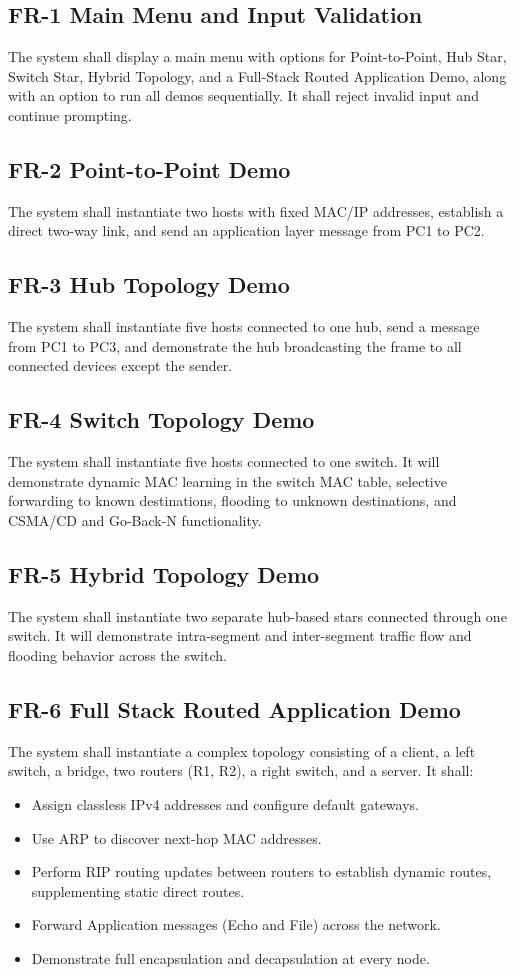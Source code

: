 \documentclass[12pt,a4paper]{article}
\begin{document}
\subsection{FR-1 Main Menu and Input Validation}
The system shall display a main menu with options for Point-to-Point, Hub Star, Switch Star, Hybrid Topology, and a Full-Stack Routed Application Demo, along with an option to run all demos sequentially. It shall reject invalid input and continue prompting.

\subsection{FR-2 Point-to-Point Demo}
The system shall instantiate two hosts with fixed MAC/IP addresses, establish a direct two-way link, and send an application layer message from PC1 to PC2.

\subsection{FR-3 Hub Topology Demo}
The system shall instantiate five hosts connected to one hub, send a message from PC1 to PC3, and demonstrate the hub broadcasting the frame to all connected devices except the sender.

\subsection{FR-4 Switch Topology Demo}
The system shall instantiate five hosts connected to one switch. It will demonstrate dynamic MAC learning in the switch MAC table, selective forwarding to known destinations, flooding to unknown destinations, and CSMA/CD and Go-Back-N functionality.

\subsection{FR-5 Hybrid Topology Demo}
The system shall instantiate two separate hub-based stars connected through one switch. It will demonstrate intra-segment and inter-segment traffic flow and flooding behavior across the switch.

\subsection{FR-6 Full Stack Routed Application Demo}
The system shall instantiate a complex topology consisting of a client, a left switch, a bridge, two routers (R1, R2), a right switch, and a server. It shall:
\begin{itemize}
    \item Assign classless IPv4 addresses and configure default gateways.
    \item Use ARP to discover next-hop MAC addresses.
    \item Perform RIP routing updates between routers to establish dynamic routes, supplementing static direct routes.
    \item Forward Application messages (Echo and File) across the network.
    \item Demonstrate full encapsulation and decapsulation at every node.
\end{itemize}
\end{document}
